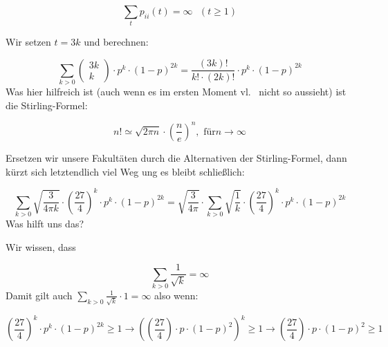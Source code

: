 \begin{uebsp}
\begin{equation*}
\sum _{t}p_{\mathit{ii}}(t)=\infty \text{    }(t\ge 1)
\end{equation*}


{
Wir setzen  $t=3k$ und berechnen:}



\begin{equation*}
\sum _{k>0}\left(\begin{matrix}3k\\k\end{matrix}\right)\cdot p^{k}\cdot
(1-p)^{2k}=\frac{(3k)!}{k!\cdot (2k)!}\cdot p^{k}\cdot (1-p)^{2k}
\end{equation*}
{
Was hier hilfreich ist (auch wenn es im ersten Moment vl. \ nicht so
aussieht) ist die Stirling-Formel:}



\begin{equation*}
n!\simeq \sqrt{2\pi n}\cdot (\frac{n}{e})^{n},\text{   f\"ur
}n\rightarrow \infty 
\end{equation*}


{
Ersetzen wir unsere Fakult\"aten durch die Alternativen der
Stirling-Formel, dann k\"urzt sich letztendlich viel Weg ung es bleibt
schlie{\ss}lich:}



\begin{equation*}
\sum _{k>0}\sqrt{\frac{3}{4\pi k}}\cdot
\left(\frac{27}{4}\right)^{k}\cdot p^{k}\cdot
(1-p)^{2k}=\sqrt{\frac{3}{4\pi }}\cdot \sum
_{k>0}\sqrt{\frac{1}{k}}\cdot \left(\frac{27}{4}\right)^{k}\cdot
p^{k}\cdot (1-p)^{2k}
\end{equation*}
{
Was hilft uns das?}



{
Wir wissen, dass}

\begin{equation*}
\sum _{k>0}{\frac{1}{\sqrt{k}}}=\infty 
\end{equation*}
{
Damit gilt auch  $\sum _{k>0}{\frac{1}{\sqrt{k}}}\cdot 1=\infty $ also
wenn:}

\begin{equation*}
\left(\frac{27}{4}\right)^{k}\cdot p^{k}\cdot (1-p)^{2k}\ge 1\rightarrow
(\left(\frac{27}{4}\right)\cdot p\cdot (1-p)^{2})^{k}\ge 1\rightarrow
\left(\frac{27}{4}\right)\cdot p\cdot (1-p)^{2}\ge 1
\end{equation*}


\end{uebsp}
